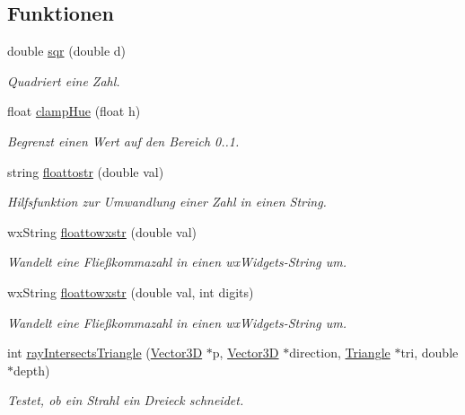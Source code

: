 \subsection*{Funktionen}
\begin{DoxyCompactItemize}
\item 
double \hyperlink{namespaceUtils_afac34330dde6235ee7395a4fd412ae0d}{sqr} (double d)
\begin{DoxyCompactList}\small\item\em Quadriert eine Zahl. \end{DoxyCompactList}\item 
float \hyperlink{namespaceUtils_abb647325616858e0fad55290c36ea03b}{clamp\-Hue} (float h)
\begin{DoxyCompactList}\small\item\em Begrenzt einen Wert auf den Bereich 0..1. \end{DoxyCompactList}\item 
string \hyperlink{namespaceUtils_a76b506eef525971ab3ccb328f4ca879d}{floattostr} (double val)
\begin{DoxyCompactList}\small\item\em Hilfsfunktion zur Umwandlung einer Zahl in einen String. \end{DoxyCompactList}\item 
wx\-String \hyperlink{namespaceUtils_a233ff9a0b34b10195a434f1ff66323b8}{floattowxstr} (double val)
\begin{DoxyCompactList}\small\item\em Wandelt eine Fließkommazahl in einen wx\-Widgets-\/\-String um. \end{DoxyCompactList}\item 
wx\-String \hyperlink{namespaceUtils_ac47160b3665d77f9e1a49a4045053add}{floattowxstr} (double val, int digits)
\begin{DoxyCompactList}\small\item\em Wandelt eine Fließkommazahl in einen wx\-Widgets-\/\-String um. \end{DoxyCompactList}\item 
int \hyperlink{namespaceUtils_a5f216cc7011a901130db81321b565334}{ray\-Intersects\-Triangle} (\hyperlink{classVector3D}{Vector3\-D} $\ast$p, \hyperlink{classVector3D}{Vector3\-D} $\ast$direction, \hyperlink{classTriangle}{Triangle} $\ast$tri, double $\ast$depth)
\begin{DoxyCompactList}\small\item\em Testet, ob ein Strahl ein Dreieck schneidet. \end{DoxyCompactList}\item 

\end{DoxyCompactItemize}
